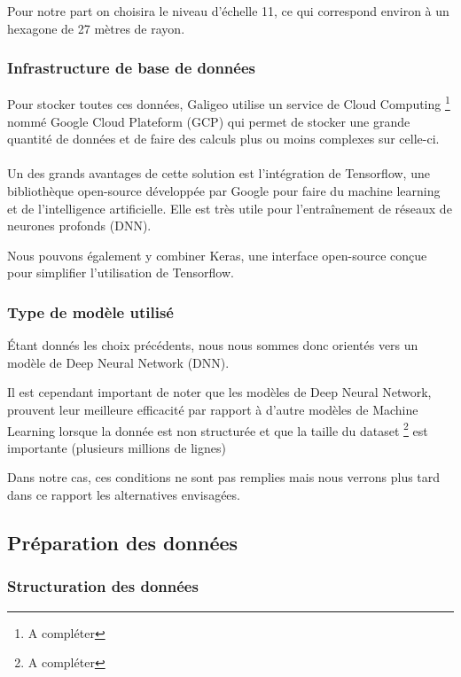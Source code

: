 Pour notre part on choisira le niveau d'échelle 11, ce qui correspond environ à un hexagone de 27 mètres de rayon.

\subsubsection{Infrastructure de base de données}

Pour stocker toutes ces données, Galigeo utilise un service de Cloud Computing \footnote{A compléter} nommé Google Cloud Plateform (GCP) qui permet de stocker une grande quantité de données et de faire des calculs plus ou moins complexes sur celle-ci.

\paragraph*{}

Un des grands avantages de cette solution est l'intégration de Tensorflow, une bibliothèque open-source développée par Google pour faire du machine learning et de l'intelligence artificielle. Elle est très utile pour l'entraînement de réseaux de neurones profonds (DNN).

Nous pouvons également y combiner Keras, une interface open-source conçue pour simplifier l'utilisation de Tensorflow.


\subsubsection{Type de modèle utilisé}

\'Etant donnés les choix précédents, nous nous sommes donc orientés vers un modèle de Deep Neural Network (DNN).

Il est cependant important de noter que les modèles de Deep Neural Network, prouvent leur meilleure efficacité par rapport à d'autre modèles de Machine Learning lorsque la donnée est non structurée et que la taille du dataset \footnote{A compléter} est importante (plusieurs millions de lignes)

Dans notre cas, ces conditions ne sont pas remplies mais nous verrons plus tard dans ce rapport les alternatives envisagées.


\subsection{Préparation des données}

\subsubsection{Structuration des données}

